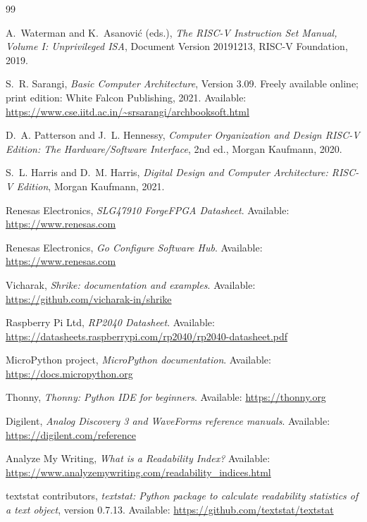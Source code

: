 \documentclass[12pt,a4paper,twoside]{article}
\begin{document}
\clearpage
\begin{thebibliography}{99}

A.~Waterman and K.~Asanovi\'c (eds.),
\emph{The RISC-V Instruction Set Manual, Volume I: Unprivileged ISA},
Document Version 20191213, RISC-V Foundation, 2019.

S.~R. Sarangi, \emph{Basic Computer Architecture}, Version 3.09.
Freely available online; print edition: White Falcon Publishing, 2021.
Available: \url{https://www.cse.iitd.ac.in/~srsarangi/archbooksoft.html}

D.~A. Patterson and J.~L. Hennessy,
\emph{Computer Organization and Design RISC-V Edition: The Hardware/Software
Interface}, 2nd ed., Morgan Kaufmann, 2020.

S.~L. Harris and D.~M. Harris,
\emph{Digital Design and Computer Architecture: RISC-V Edition},
Morgan Kaufmann, 2021.

Renesas Electronics, \emph{SLG47910 ForgeFPGA Datasheet}.
Available: \url{https://www.renesas.com}

Renesas Electronics, \emph{Go Configure Software Hub}.
Available: \url{https://www.renesas.com}

Vicharak, \emph{Shrike: documentation and examples}.
Available: \url{https://github.com/vicharak-in/shrike}

Raspberry Pi Ltd, \emph{RP2040 Datasheet}.
Available: \url{https://datasheets.raspberrypi.com/rp2040/rp2040-datasheet.pdf}

MicroPython project, \emph{MicroPython documentation}.
Available: \url{https://docs.micropython.org}

Thonny, \emph{Thonny: Python IDE for beginners}.
Available: \url{https://thonny.org}

Digilent, \emph{Analog Discovery 3 and WaveForms reference manuals}.
Available: \url{https://digilent.com/reference}

Analyze My Writing, \emph{What is a Readability Index?}
Available: \url{https://www.analyzemywriting.com/readability_indices.html}

textstat contributors, \emph{textstat: Python package to calculate readability
statistics of a text object}, version 0.7.13.
Available: \url{https://github.com/textstat/textstat}

\end{thebibliography}
\end{document}
